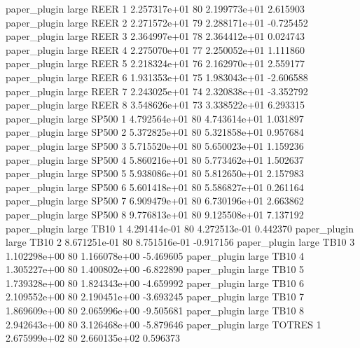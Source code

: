        paper_plugin      large     REER                 1 2.257317e+01 80   2.199773e+01           2.615903
       paper_plugin      large     REER                 2 2.271572e+01 79   2.288171e+01          -0.725452
       paper_plugin      large     REER                 3 2.364997e+01 78   2.364412e+01           0.024743
       paper_plugin      large     REER                 4 2.275070e+01 77   2.250052e+01           1.111860
       paper_plugin      large     REER                 5 2.218324e+01 76   2.162970e+01           2.559177
       paper_plugin      large     REER                 6 1.931353e+01 75   1.983043e+01          -2.606588
       paper_plugin      large     REER                 7 2.243025e+01 74   2.320838e+01          -3.352792
       paper_plugin      large     REER                 8 3.548626e+01 73   3.338522e+01           6.293315
       paper_plugin      large    SP500                 1 4.792564e+01 80   4.743614e+01           1.031897
       paper_plugin      large    SP500                 2 5.372825e+01 80   5.321858e+01           0.957684
       paper_plugin      large    SP500                 3 5.715520e+01 80   5.650023e+01           1.159236
       paper_plugin      large    SP500                 4 5.860216e+01 80   5.773462e+01           1.502637
       paper_plugin      large    SP500                 5 5.938086e+01 80   5.812650e+01           2.157983
       paper_plugin      large    SP500                 6 5.601418e+01 80   5.586827e+01           0.261164
       paper_plugin      large    SP500                 7 6.909479e+01 80   6.730196e+01           2.663862
       paper_plugin      large    SP500                 8 9.776813e+01 80   9.125508e+01           7.137192
       paper_plugin      large     TB10                 1 4.291414e-01 80   4.272513e-01           0.442370
       paper_plugin      large     TB10                 2 8.671251e-01 80   8.751516e-01          -0.917156
       paper_plugin      large     TB10                 3 1.102298e+00 80   1.166078e+00          -5.469605
       paper_plugin      large     TB10                 4 1.305227e+00 80   1.400802e+00          -6.822890
       paper_plugin      large     TB10                 5 1.739328e+00 80   1.824343e+00          -4.659992
       paper_plugin      large     TB10                 6 2.109552e+00 80   2.190451e+00          -3.693245
       paper_plugin      large     TB10                 7 1.869609e+00 80   2.065996e+00          -9.505681
       paper_plugin      large     TB10                 8 2.942643e+00 80   3.126468e+00          -5.879646
       paper_plugin      large   TOTRES                 1 2.675999e+02 80   2.660135e+02           0.596373
